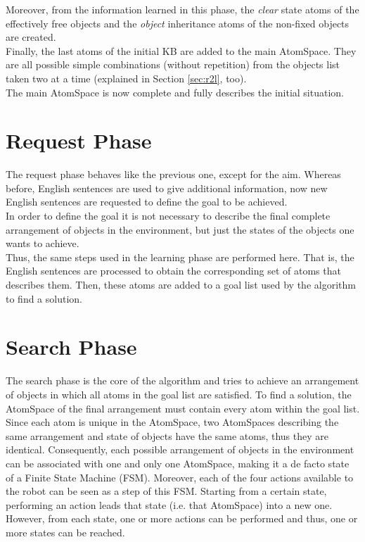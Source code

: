 Moreover, from the information learned in this phase, the \textit{clear} state atoms of the effectively free objects and the \textit{object} inheritance atoms of the non-fixed objects are created.  \\
Finally, the last atoms of the initial KB are added to the main AtomSpace. They are all possible simple combinations (without repetition) from the objects list taken two at a time (explained in Section \ref{sec:r2l}, too). \\
The main AtomSpace is now complete and fully describes the initial situation. 

\section{Request Phase}\label{sec:request}

The request phase behaves like the previous one, except for the aim. Whereas before, English sentences are used to give additional information, now new English sentences are requested to define the goal to be achieved. \\
In order to define the goal it is not necessary to describe the final complete arrangement of objects in the environment, but just the states of the objects one wants to achieve. \\
Thus, the same steps used in the learning phase are performed here. That is, the English sentences are processed to obtain the corresponding set of atoms that describes them. Then, these atoms are added to a goal list used by the algorithm to find a solution.

\section{Search Phase}\label{sec:search}

The search phase is the core of the algorithm and tries to achieve an arrangement of objects in which all atoms in the goal list are satisfied.
To find a solution, the AtomSpace of the final arrangement must contain every atom within the goal list. \\

Since each atom is unique in the AtomSpace, two AtomSpaces describing the same arrangement and state of objects have the same atoms, thus they are identical. 
Consequently, each possible arrangement of objects in the environment can be associated with one and only one AtomSpace, making it a de facto state of a Finite State Machine (FSM).
Moreover, each of the four actions available to the robot can be seen as a step of this FSM. 
Starting from a certain state, performing an action leads that state (i.e. that AtomSpace) into a new one. However, from each state, one or more actions can be performed and thus, one or more states can be reached. \\

